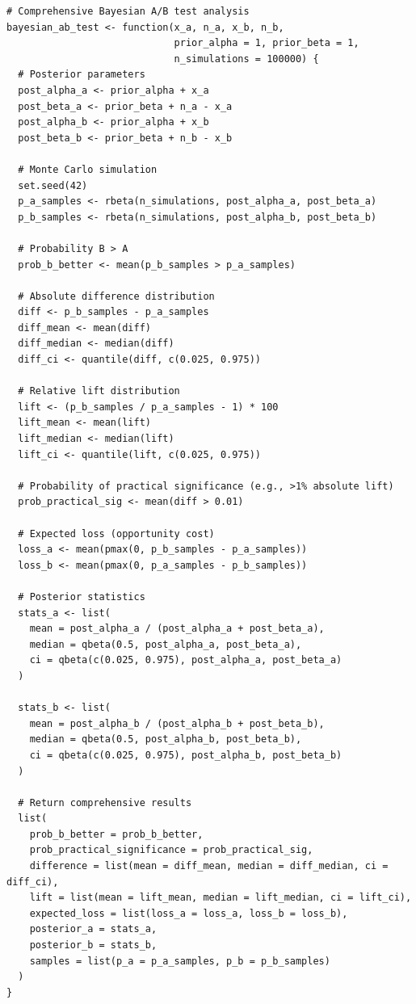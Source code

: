 \lstset{language=R, caption=Bayesian A/B Test Comparison}
\begin{lstlisting}
# Comprehensive Bayesian A/B test analysis
bayesian_ab_test <- function(x_a, n_a, x_b, n_b,
                             prior_alpha = 1, prior_beta = 1,
                             n_simulations = 100000) {
  # Posterior parameters
  post_alpha_a <- prior_alpha + x_a
  post_beta_a <- prior_beta + n_a - x_a
  post_alpha_b <- prior_alpha + x_b
  post_beta_b <- prior_beta + n_b - x_b

  # Monte Carlo simulation
  set.seed(42)
  p_a_samples <- rbeta(n_simulations, post_alpha_a, post_beta_a)
  p_b_samples <- rbeta(n_simulations, post_alpha_b, post_beta_b)

  # Probability B > A
  prob_b_better <- mean(p_b_samples > p_a_samples)

  # Absolute difference distribution
  diff <- p_b_samples - p_a_samples
  diff_mean <- mean(diff)
  diff_median <- median(diff)
  diff_ci <- quantile(diff, c(0.025, 0.975))

  # Relative lift distribution
  lift <- (p_b_samples / p_a_samples - 1) * 100
  lift_mean <- mean(lift)
  lift_median <- median(lift)
  lift_ci <- quantile(lift, c(0.025, 0.975))

  # Probability of practical significance (e.g., >1% absolute lift)
  prob_practical_sig <- mean(diff > 0.01)

  # Expected loss (opportunity cost)
  loss_a <- mean(pmax(0, p_b_samples - p_a_samples))
  loss_b <- mean(pmax(0, p_a_samples - p_b_samples))

  # Posterior statistics
  stats_a <- list(
    mean = post_alpha_a / (post_alpha_a + post_beta_a),
    median = qbeta(0.5, post_alpha_a, post_beta_a),
    ci = qbeta(c(0.025, 0.975), post_alpha_a, post_beta_a)
  )

  stats_b <- list(
    mean = post_alpha_b / (post_alpha_b + post_beta_b),
    median = qbeta(0.5, post_alpha_b, post_beta_b),
    ci = qbeta(c(0.025, 0.975), post_alpha_b, post_beta_b)
  )

  # Return comprehensive results
  list(
    prob_b_better = prob_b_better,
    prob_practical_significance = prob_practical_sig,
    difference = list(mean = diff_mean, median = diff_median, ci = diff_ci),
    lift = list(mean = lift_mean, median = lift_median, ci = lift_ci),
    expected_loss = list(loss_a = loss_a, loss_b = loss_b),
    posterior_a = stats_a,
    posterior_b = stats_b,
    samples = list(p_a = p_a_samples, p_b = p_b_samples)
  )
}


\end{lstlisting}
